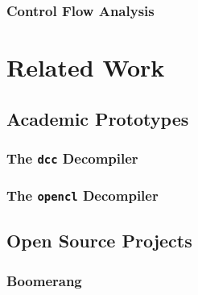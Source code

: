 \documentclass[12pt, a4paper]{article}
\begin{document}
\cite{type_decomp}


\subsubsection{Control Flow Analysis}


\section{Related Work}


\subsection{Academic Prototypes}


\subsubsection{The \texttt{dcc} Decompiler}

\cite{rev_comp}


\subsubsection{The \texttt{opencl} Decompiler}

\cite{decomp_llvm}


\subsection{Open Source Projects}


\subsubsection{Boomerang}
\end{document}
